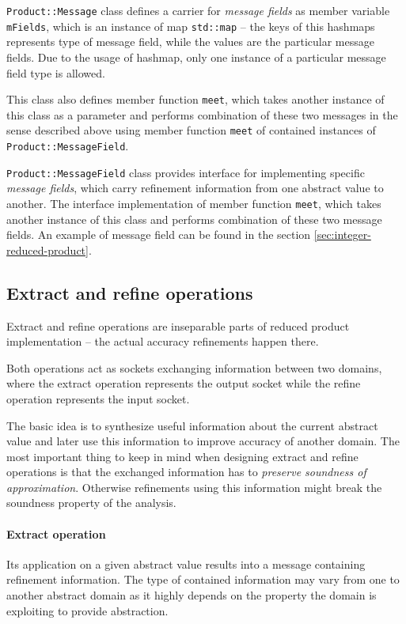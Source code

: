 \documentclass[12pt,oneside]{fithesis2}
\theoremstyle{definition}
\begin{document}
\texttt{Product::Message} class defines a carrier for \textit{message fields} as member variable \texttt{mFields}, which is an instance of map \texttt{std::map} -- the keys of this hashmaps represents type of message field, while the values are the particular message fields. Due to the usage of hashmap, only one instance of a particular message field type is allowed.

This class also defines member function \texttt{meet}, which takes another instance of this class as a parameter and performs combination of these two messages in the sense described above using member function \texttt{meet} of contained instances of \texttt{Product::MessageField}.

\texttt{Product::MessageField} class provides interface for implementing specific \textit{message fields}, which carry refinement information from one abstract value to another. The interface implementation of member function \texttt{meet}, which takes another instance of this class and performs combination of these two message fields. An example of message field can be found in the section \ref{sec:integer-reduced-product}.

\subsection{Extract and refine operations}

Extract and refine operations are inseparable parts of reduced product implementation -- the actual accuracy refinements happen there.

Both operations act as sockets exchanging information between two domains, where the extract operation represents the output socket while the refine operation represents the input socket.

The basic idea is to synthesize useful information about the current abstract value and later use this information to improve accuracy of another domain. The most important thing to keep in mind when designing extract and refine operations is that the exchanged information has to \textit{preserve soundness of approximation}. Otherwise refinements using this information might break the soundness property of the analysis.

\paragraph{Extract operation}
Its application on a given abstract value results into a message containing refinement information. The type of contained information may vary from one to another abstract domain as it highly depends on the property the domain is exploiting to provide abstraction.
\end{document}
